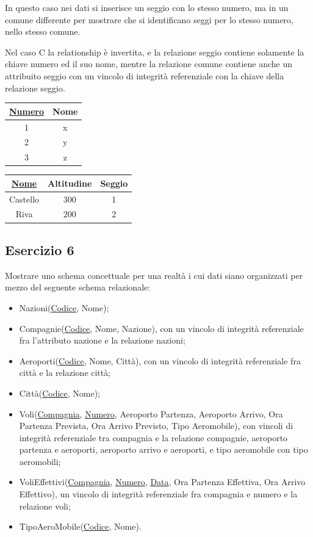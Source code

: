 \documentclass{article}
\numberwithin{equation}{subsection}
\begin{document}
In questo caso nei dati si inserisce un seggio con lo stesso numero, ma in un comune differente per mostrare che si identificano seggi per lo 
stesso numero, nello stesso comune. 

Nel caso C la relationship è invertita, e la relazione seggio contiene solamente la chiave numero ed il suo nome, mentre la relazione comune 
contiene anche un attribuito seggio con un vincolo di integrità referenziale con la chiave della relazione seggio. 
\begin{center}
    \begin{tabular}{|c|c|}
        \hline 
        \underline{Numero} & Nome \\
        \hline
        1 & x \\
        \hline
        2 & y \\
        \hline
        3 & z \\
        \hline
    \end{tabular}
    \begin{tabular}{|c|c|c|}
        \hline
        \underline{Nome} & Altitudine & Seggio\\
        \hline
        Castello & 300 & 1\\
        \hline
        Riva & 200 & 2\\
        \hline
    \end{tabular}
\end{center}

\subsection{Esercizio 6}

Mostrare uno schema concettuale per una realtà i cui dati siano organizzati per mezzo del seguente schema relazionale:
\begin{itemize}
    \item Nazioni(\underline{Codice}, Nome);
    \item Compagnie(\underline{Codice}, Nome, Nazione), con un vincolo di integrità referenziale fra l'attributo nazione e la relazione nazioni;
    \item Aeroporti(\underline{Codice}, Nome, Città), con un vincolo di integrità referenziale fra città e la relazione città;
    \item Città(\underline{Codice}, Nome);
    \item Voli(\underline{Compagnia}, \underline{Numero}, Aeroporto Partenza, Aeroporto Arrivo, Ora Partenza Prevista, Ora Arrivo Previsto, Tipo Aeromobile), con vincoli 
    di integrità referenziale tra compagnia e la relazione compagnie, aeroporto partenza e aeroporti, aeroporto arrivo e aeroporti, e tipo aeromobile con tipo aeromobili;
    \item VoliEffettivi(\underline{Compagnia}, \underline{Numero}, \underline{Data}, Ora Partenza Effettiva, Ora Arrivo Effettivo), un vincolo di integrità referenziale fra compagnia e numero e la relazione voli;
    \item TipoAeroMobile(\underline{Codice}, Nome).
\end{itemize}
\end{document}
